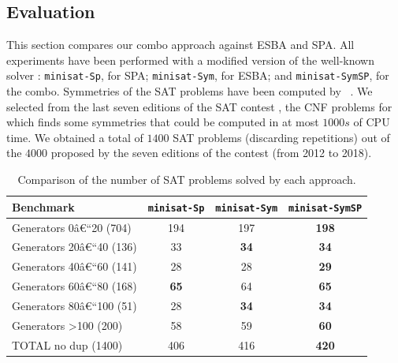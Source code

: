 \subsection{Evaluation}
This section compares our combo approach against ESBA and SPA. All experiments
have been performed with a modified version of the well-known \minisat{} solver \cite{een2003extensible}: \texttt{minisat-Sp}, for
SPA; \texttt{minisat-Sym}, for ESBA; and \texttt{minisat-SymSP}, for the
combo. Symmetries of the SAT problems have been computed by
\bliss{}~\cite{JunttilaKaski:ALENEX2007}.
We selected from the last seven editions of the SAT contest
\cite{jarvisalo2012international}, the CNF problems for which \bliss{} finds
some symmetries that could be computed in at most $1000s$ of CPU time. We
obtained a total of $1400$ SAT problems (discarding repetitions) out of the
$4000$ proposed by the seven editions of the contest (from 2012 to 2018).
\begin{table}\footnotesize
 \centering
 \begin{tabular}{l|ccc}
  \toprule
  Benchmark  &\texttt{minisat-Sp} & \texttt{minisat-Sym} & \texttt{minisat-SymSP}\\
  \hline 
  Generators 0â€“20 (704) & 194&197&\cellcolor{gray!30,}\textbf{198}\\
  Generators 20â€“40 (136) & 33&\cellcolor{gray!30}\textbf{34}&\cellcolor{gray!30}\textbf{34}\\
  Generators 40â€“60 (141) & 28&28&\cellcolor{gray!30}\textbf{29}\\
  Generators 60â€“80 (168) & \cellcolor{gray!30}\textbf{65}&64&\cellcolor{gray!30}\textbf{65}\\
  Generators 80â€“100 (51) & 28&\cellcolor{gray!30}\textbf{34}&\cellcolor{gray!30}\textbf{34}\\
  Generators  \textgreater100 (200) & 58&59&\cellcolor{gray!30}\textbf{60}\\
  \hline 
  TOTAL no dup (1400) & 406 & 416 & \cellcolor{gray!30,}\textbf{420}\\
  \bottomrule
 \end{tabular}
 \caption{Comparison of the number of SAT problems solved by each approach.}
 \label{tab:sat}
\end{table}
